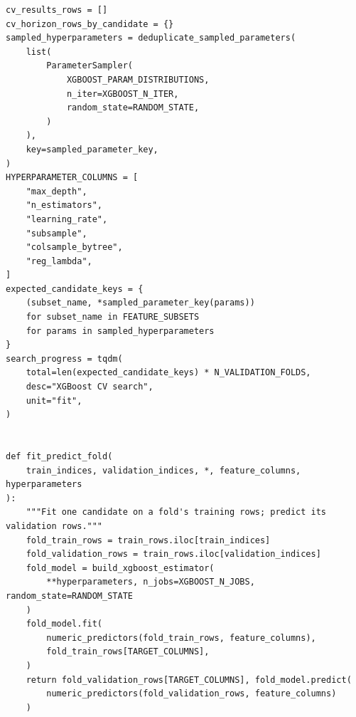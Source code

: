 \begin{verbatim}
cv_results_rows = []
cv_horizon_rows_by_candidate = {}
sampled_hyperparameters = deduplicate_sampled_parameters(
    list(
        ParameterSampler(
            XGBOOST_PARAM_DISTRIBUTIONS,
            n_iter=XGBOOST_N_ITER,
            random_state=RANDOM_STATE,
        )
    ),
    key=sampled_parameter_key,
)
HYPERPARAMETER_COLUMNS = [
    "max_depth",
    "n_estimators",
    "learning_rate",
    "subsample",
    "colsample_bytree",
    "reg_lambda",
]
expected_candidate_keys = {
    (subset_name, *sampled_parameter_key(params))
    for subset_name in FEATURE_SUBSETS
    for params in sampled_hyperparameters
}
search_progress = tqdm(
    total=len(expected_candidate_keys) * N_VALIDATION_FOLDS,
    desc="XGBoost CV search",
    unit="fit",
)


def fit_predict_fold(
    train_indices, validation_indices, *, feature_columns, hyperparameters
):
    """Fit one candidate on a fold's training rows; predict its validation rows."""
    fold_train_rows = train_rows.iloc[train_indices]
    fold_validation_rows = train_rows.iloc[validation_indices]
    fold_model = build_xgboost_estimator(
        **hyperparameters, n_jobs=XGBOOST_N_JOBS, random_state=RANDOM_STATE
    )
    fold_model.fit(
        numeric_predictors(fold_train_rows, feature_columns),
        fold_train_rows[TARGET_COLUMNS],
    )
    return fold_validation_rows[TARGET_COLUMNS], fold_model.predict(
        numeric_predictors(fold_validation_rows, feature_columns)
    )



\end{verbatim}
